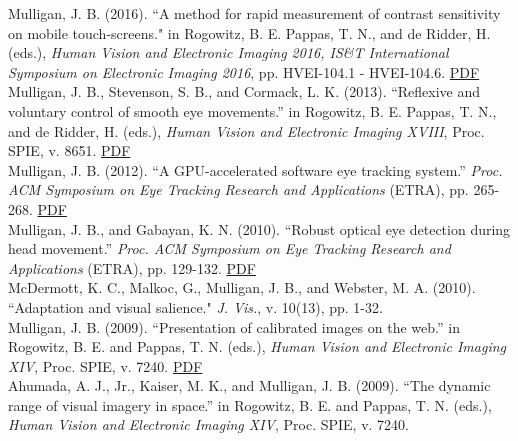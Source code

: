 \documentclass[12pt]{article}
\newcommand{\years}[1]{\marginnote{\scriptsize #1}}
\begin{document}
\years{2016}
Mulligan, J. B. (2016).  ``A method for rapid measurement of contrast sensitivity on mobile touch-screens." in Rogowitz, B. E. Pappas, T. N., and de Ridder, H. (eds.), \emph{Human Vision and Electronic Imaging 2016, IS\&T International Symposium on Electronic Imaging 2016},  pp. HVEI-104.1 - HVEI-104.6.  \href{https://hsi.arc.nasa.gov/publications/Mulligan_HVEI_2016_Rapid_Meas_Mobile.pdf}{PDF}\\

\years{2013}
Mulligan, J. B., Stevenson, S. B., and Cormack, L. K. (2013).
``Reflexive and voluntary control of smooth eye movements.”
in Rogowitz, B. E. Pappas, T. N., and de Ridder, H. (eds.),
\emph{Human Vision and Electronic Imaging XVIII},
Proc. SPIE, v. 8651.  \href{https://hsi.arc.nasa.gov/publications/mulligan_et_al_spie13.pdf}{PDF}\\

\years{2012}
Mulligan, J. B. (2012).
``A GPU-accelerated software eye tracking system.”
\emph{Proc. ACM Symposium on Eye Tracking Research and Applications} (ETRA),
pp. 265-268.  \href{https://hsi.arc.nasa.gov/publications/mulligan_etra12.pdf}{PDF}\\


\years{2010}
Mulligan, J. B., and Gabayan, K. N. (2010).
``Robust optical eye detection during head movement.”
\emph{Proc. ACM Symposium on Eye Tracking Research and Applications} (ETRA),
pp. 129-132.  \href{https://hsi.arc.nasa.gov/publications/mulligan_gabayan_etra10.pdf}{PDF}\\

McDermott, K. C., Malkoc, G., Mulligan, J. B., and Webster, M. A. (2010).
``Adaptation and visual salience."
\emph{J. Vis.}, v. 10(13), pp. 1-32.\\

\years{2009}
Mulligan, J. B. (2009).
``Presentation of calibrated images on the web.”
in Rogowitz, B. E. and Pappas, T. N. (eds.),
\emph{Human Vision and Electronic Imaging XIV},
Proc. SPIE, v. 7240.  \href{https://hsi.arc.nasa.gov/publications/mulligan_spie09.pdf}{PDF}\\

Ahumada, A. J., Jr., Kaiser, M. K., and Mulligan, J. B. (2009).
``The dynamic range of visual imagery in space.”
in Rogowitz, B. E. and Pappas, T. N. (eds.),
\emph{Human Vision and Electronic Imaging XIV},
Proc. SPIE, v. 7240.\\
\end{document}
